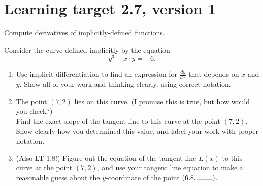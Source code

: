 \pagebreak

\section{Learning target 2.7, version 1}

Compute derivatives of implicitly-defined functions.

\hrulefill

Consider the curve defined implicitly by the equation
\[y^3-x\cdot y = -6.\]
	
\begin{enumerate}[leftmargin=15pt]

	\item Use implicit differentiation to find an expression for $\frac{dy}{dx}$ that depends on $x$ and $y$.  Show all of your work and thinking clearly, using correct notation.

	\vfill

	\item The point $(7,2)$ lies on this curve. (I promise this is true, but how would you check?) \\
	Find the exact slope of the tangent line to this curve at the point \((7,2)\). Show clearly how you determined this value, and label your work with proper notation.

	\vspace{1.25in}

	
	\item (Also LT 1.8!) Figure out the equation of the tangent line $L(x)$ to this curve at the point $(7,2)$, and use your tangent line equation to make a reasonable guess about the $y$-coordinate of the point $(6.8, \rule{0.75cm}{0.15mm} )$.
	\vfill

\end{enumerate}

